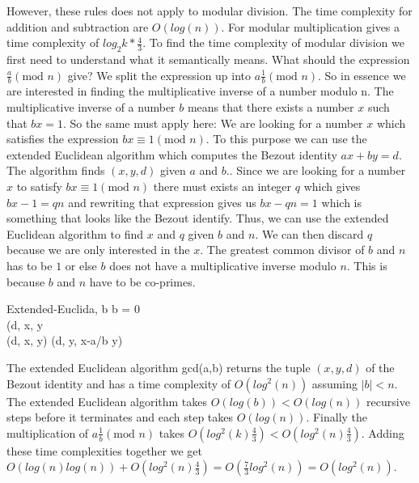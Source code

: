 \documentclass[a4paper,oneside,article]{memoir}
\begin{document}
\noindent However, these rules does not apply to modular division. The time complexity for addition and subtraction are $O(log(n))$. For modular multiplication \cite{complexity} gives a time complexity of $log_2{k}*\frac{4}{3}$. To find the time complexity of modular division we first need to understand what it semantically means. What should the expression $\frac{a}{b} (\text{mod } n)$ give? We split the expression up into $a \frac{1}{b} (\text{mod } n)$. So in essence we are interested in finding the multiplicative inverse of a number modulo n. The multiplicative inverse of a number $b$ means that there exists a number $x$ such that $bx = 1$. So the same must apply here: We are looking for a number $x$ which satisfies the expression $bx \equiv 1 (\text{mod } n)$. To this purpose we can use the extended Euclidean algorithm which computes the Bezout identity $ax + by = d$. The algorithm finds $(x,y,d)$ given $a$ and $b$.. Since we are looking for a number $x$ to satisfy $bx \equiv 1 (\text{mod } n)$ there must exists an integer $q$ which gives $bx -1 = qn$ and rewriting that expression gives us $bx -qn = 1$ which is something that looks like the Bezout identify. Thus, we can use the extended Euclidean algorithm to find $x$ and $q$ given $b$ and $n$. We can then discard $q$ because we are only interested in the $x$. The greatest common divisor of $b$ and $n$ has to be $1$ or else $b$ does not have a multiplicative inverse modulo $n$. This is because $b$ and $n$ have to be co-primes.

\begin{pseudocode}{Extended-Euclid}{a, b}
  \IF b = 0 \THEN {}\\
  (d\prime , x\prime , y\prime  \GETS {}\\
  (d, x, y) \GETS (d\prime , y\prime , x\prime  -\lfloor a/b \rfloor y\prime )\\
\end{pseudocode}

The extended Euclidean algorithm gcd(a,b) returns the tuple $(x,y,d)$ of the Bezout identity and has a time complexity of $O(log^2(n))$ assuming $|b| < n$. The extended Euclidean algorithm takes $O(log(b)) < O(log(n))$ recursive steps before it terminates and each step takes $O(log(n))$. Finally the multiplication of $a \frac{1}{b} (\text{mod } n)$ takes $O(log^2(k)\frac{4}{3}) < O(log^2(n)\frac{4}{3})$. Adding these time complexities together we get $O(log(n)log(n)) + O(log^2(n)\frac{4}{3}) = O(\frac{7}{3}log^2(n)) = O(log^2(n))$.
\end{document}
